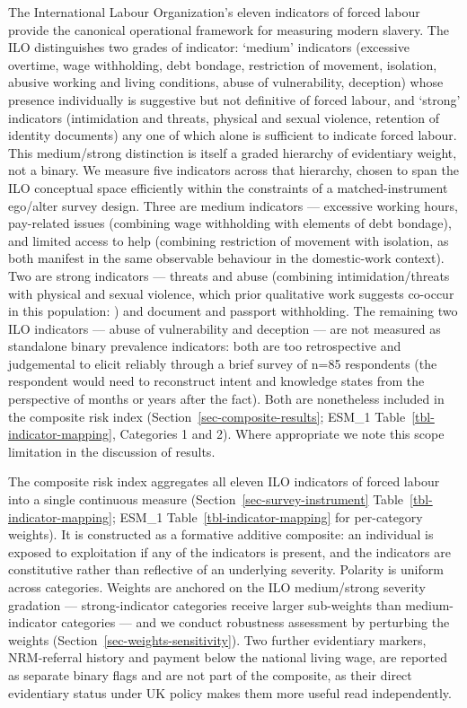 \documentclass[
  12pt,
  letterpaper,
  DIV=11,
  numbers=noendperiod]{scrartcl}
\begin{document}
The International Labour Organization's eleven indicators of forced
labour
\autocite{ILO11-indicators,international_labour_organization_global_2017}
provide the canonical operational framework for measuring modern
slavery. The ILO distinguishes two grades of indicator: `medium'
indicators (excessive overtime, wage withholding, debt bondage,
restriction of movement, isolation, abusive working and living
conditions, abuse of vulnerability, deception) whose presence
individually is suggestive but not definitive of forced labour, and
`strong' indicators (intimidation and threats, physical and sexual
violence, retention of identity documents) any one of which alone is
sufficient to indicate forced labour. This medium/strong distinction is
itself a graded hierarchy of evidentiary weight, not a binary. We
measure five indicators across that hierarchy, chosen to span the ILO
conceptual space efficiently within the constraints of a
matched-instrument ego/alter survey design. Three are medium indicators
--- excessive working hours, pay-related issues (combining wage
withholding with elements of debt bondage), and limited access to help
(combining restriction of movement with isolation, as both manifest in
the same observable behaviour in the domestic-work context). Two are
strong indicators --- threats and abuse (combining intimidation/threats
with physical and sexual violence, which prior qualitative work suggests
co-occur in this population: \textcite{yilm23-exploring}) and document
and passport withholding. The remaining two ILO indicators --- abuse of
vulnerability and deception --- are not measured as standalone binary
prevalence indicators: both are too retrospective and judgemental to
elicit reliably through a brief survey of n=85 respondents (the
respondent would need to reconstruct intent and knowledge states from
the perspective of months or years after the fact). Both are nonetheless
included in the composite risk index
(Section~\ref{sec-composite-results}; ESM\_1
Table~\ref{tbl-indicator-mapping}, Categories 1 and 2). Where
appropriate we note this scope limitation in the discussion of results.

The composite risk index aggregates all eleven ILO indicators of forced
labour into a single continuous measure
(Section~\ref{sec-survey-instrument} Table~\ref{tbl-indicator-mapping};
ESM\_1 Table~\ref{tbl-indicator-mapping} for per-category weights). It
is constructed as a formative additive composite: an individual is
exposed to exploitation if any of the indicators is present, and the
indicators are constitutive rather than reflective of an underlying
severity. Polarity is uniform across categories. Weights are anchored on
the ILO medium/strong severity gradation --- strong-indicator categories
receive larger sub-weights than medium-indicator categories --- and we
conduct robustness assessment by perturbing the weights
(Section~\ref{sec-weights-sensitivity}). Two further evidentiary
markers, NRM-referral history and payment below the national living
wage, are reported as separate binary flags and are not part of the
composite, as their direct evidentiary status under UK policy makes them
more useful read independently.
\end{document}
